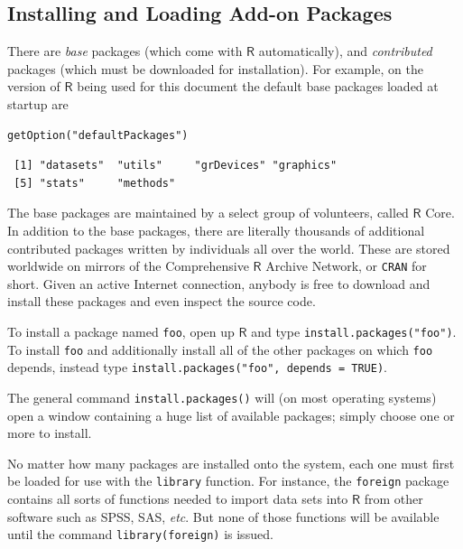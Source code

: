 \documentclass[captions=tableheading]{scrbook}
\begin{document}
\subsection{Installing and Loading Add-on Packages}
\label{sec-2-1-2}
\label{sub-installing-loading-packages}


There are \emph{base} packages (which come with \(\mathsf{R}\) automatically), and \emph{contributed} packages (which must be downloaded for installation). For example, on the version of \(\mathsf{R}\) being used for this document the default base packages loaded at startup are 


\begin{verbatim}
getOption("defaultPackages")
\end{verbatim}

\begin{verbatim}
 [1] "datasets"  "utils"     "grDevices" "graphics" 
 [5] "stats"     "methods"
\end{verbatim}

The base packages are maintained by a select group of volunteers, called \(\mathsf{R}\) Core. In addition to the base packages, there are literally thousands of additional contributed packages written by individuals all over the world. These are stored worldwide on mirrors of the Comprehensive \(\mathsf{R}\) Archive Network, or \texttt{CRAN} for short. Given an active Internet connection, anybody is free to download and install these packages and even inspect the source code.

To install a package named \texttt{foo}, open up \(\mathsf{R}\) and type \texttt{install.packages("foo")}. To install \texttt{foo} and additionally install all of the other packages on which \texttt{foo} depends, instead type \texttt{install.packages("foo", depends = TRUE)}.

The general command \texttt{install.packages()} will (on most operating systems) open a window containing a huge list of available packages; simply choose one or more to install.

No matter how many packages are installed onto the system, each one must first be loaded for use with the \texttt{library} function. For instance, the \texttt{foreign} package \cite{foreign} contains all sorts of functions needed to import data sets into \(\mathsf{R}\) from other software such as SPSS, SAS, \emph{etc}. But none of those functions will be available until the command \texttt{library(foreign)} is issued. 
\end{document}
